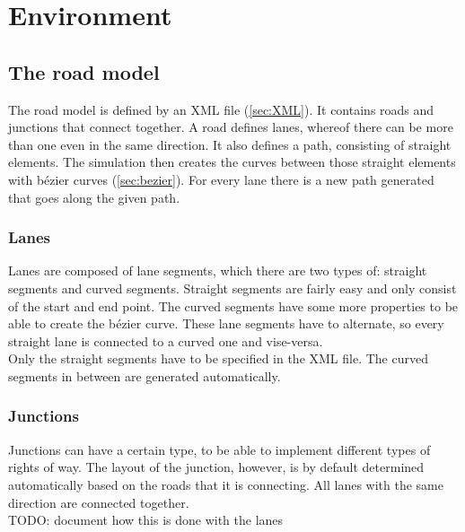 
\section{Environment}
\label{sec:environment}

\subsection{The road model}
\label{sec:roadModel}

The road model is defined by an XML file (\ref{sec:XML}). It contains roads and
junctions that connect together. A road defines lanes, whereof
there can be more than one even in the same direction. It also defines
a path, consisting of straight elements. The simulation then creates the 
curves between those straight elements with bézier curves (\ref{sec:bezier}).
For every lane there is a new path generated that goes along the given path.


\subsubsection{Lanes}
\label{sec:lanes}

Lanes are composed of lane segments, which there are two types of:
straight segments and curved segments. Straight segments are fairly
easy and only consist of the start and end point. The curved segments
have some more properties to be able to create the bézier curve. 
These lane segments have to alternate, so every straight lane is connected
to a curved one and vise-versa. \\

\noindent Only the straight segments have to be specified in the XML file. 
The curved segments in between are generated automatically.


\subsubsection{Junctions}
\label{sec:junctions}

Junctions can have a certain type, to be able to implement different types
of rights of way. The layout of the junction, however, is by default 
determined automatically based on the roads that it is connecting. All 
lanes with the same direction are connected together. \\

TODO: document how this is done with the lanes

